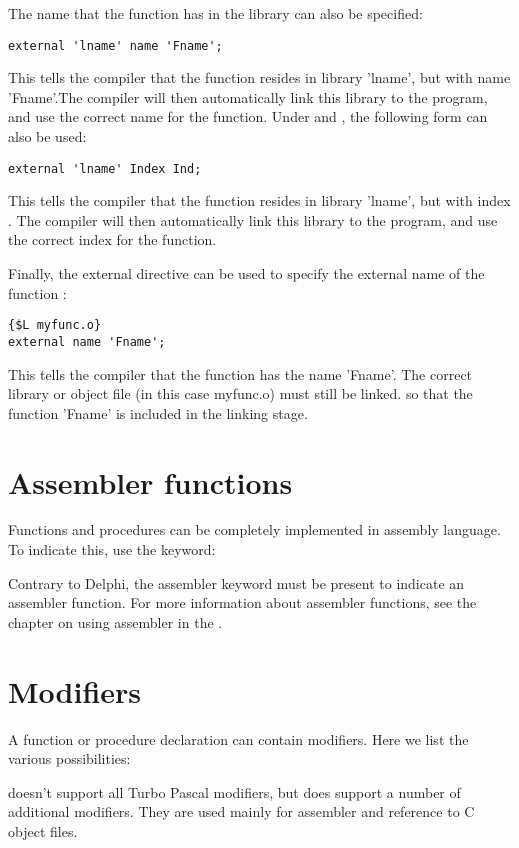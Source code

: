 The name that the function has in the library can also be specified:
\begin{verbatim}
external 'lname' name 'Fname';
\end{verbatim}
This tells the compiler that the function resides in library 'lname',
but with name 'Fname'.The compiler will then automatically link this
library to the program, and use the correct name for the function.
Under \windows and \ostwo, the following form can also be used:
\begin{verbatim}
external 'lname' Index Ind;
\end{verbatim}
This tells the compiler that the function resides in library 'lname',
but with index . The compiler will then automatically
link this library to the program, and use the correct index for the
function.

Finally, the external directive can be used to specify the external name
of the function :
\begin{verbatim}
{$L myfunc.o}
external name 'Fname';
\end{verbatim}
This tells the compiler that the function has the name 'Fname'. The
correct library or object file (in this case myfunc.o) must still be linked.
so that the function 'Fname' is included in the linking stage.

\section{Assembler functions}
Functions and procedures can be completely implemented in assembly
language. To indicate this, use the  keyword:

Contrary to Delphi, the assembler keyword must be present to indicate an
assembler function.
For more information about assembler functions, see the chapter on using
assembler in the \progref.


\section{Modifiers}
A function or procedure declaration can contain modifiers. Here we list the
various possibilities:

\fpc doesn't support all Turbo Pascal modifiers, but
does support a number of additional modifiers. They are used mainly for assembler and
reference to C object files.

